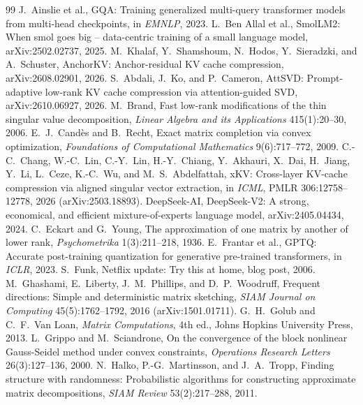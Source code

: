 \documentclass[10pt]{article}
\theoremstyle{plain}
\theoremstyle{definition}
\theoremstyle{remark}
\begin{document}
{\small
\begin{thebibliography}{99}
\setlength{\itemsep}{0pt}
 J.~Ainslie et al., GQA: Training generalized multi-query transformer models from multi-head checkpoints, in \emph{EMNLP}, 2023.
 L.~Ben Allal et al., SmolLM2: When smol goes big -- data-centric training of a small language model, arXiv:2502.02737, 2025.
 M.~Khalaf, Y.~Shamshoum, N.~Hodos, Y.~Sieradzki, and A.~Schuster, AnchorKV: Anchor-residual KV cache compression, arXiv:2608.02901, 2026.
 S.~Abdali, J.~Ko, and P.~Cameron, AttSVD: Prompt-adaptive low-rank KV cache compression via attention-guided SVD, arXiv:2610.06927, 2026.
 M.~Brand, Fast low-rank modifications of the thin singular value decomposition, \emph{Linear Algebra and its Applications} 415(1):20--30, 2006.
 E.~J.~Cand\`es and B.~Recht, Exact matrix completion via convex optimization, \emph{Foundations of Computational Mathematics} 9(6):717--772, 2009.
 C.-C.~Chang, W.-C.~Lin, C.-Y.~Lin, H.-Y.~Chiang, Y.~Akhauri, X.~Dai, H.~Jiang, Y.~Li, L.~Ceze, K.-C.~Wu, and M.~S.~Abdelfattah, xKV: Cross-layer KV-cache compression via aligned singular vector extraction, in \emph{ICML}, PMLR 306:12758--12778, 2026 (arXiv:2503.18893).
 DeepSeek-AI, DeepSeek-V2: A strong, economical, and efficient mixture-of-experts language model, arXiv:2405.04434, 2024.
 C.~Eckart and G.~Young, The approximation of one matrix by another of lower rank, \emph{Psychometrika} 1(3):211--218, 1936.
 E.~Frantar et al., GPTQ: Accurate post-training quantization for generative pre-trained transformers, in \emph{ICLR}, 2023.
 S.~Funk, Netflix update: Try this at home, blog post, 2006.
 M.~Ghashami, E.~Liberty, J.~M.~Phillips, and D.~P.~Woodruff, Frequent directions: Simple and deterministic matrix sketching, \emph{SIAM Journal on Computing} 45(5):1762--1792, 2016 (arXiv:1501.01711).
 G.~H.~Golub and C.~F.~Van Loan, \emph{Matrix Computations}, 4th ed., Johns Hopkins University Press, 2013.
 L.~Grippo and M.~Sciandrone, On the convergence of the block nonlinear Gauss-Seidel method under convex constraints, \emph{Operations Research Letters} 26(3):127--136, 2000.
 N.~Halko, P.-G.~Martinsson, and J.~A.~Tropp, Finding structure with randomness: Probabilistic algorithms for constructing approximate matrix decompositions, \emph{SIAM Review} 53(2):217--288, 2011.

\end{thebibliography}}
\end{document}
